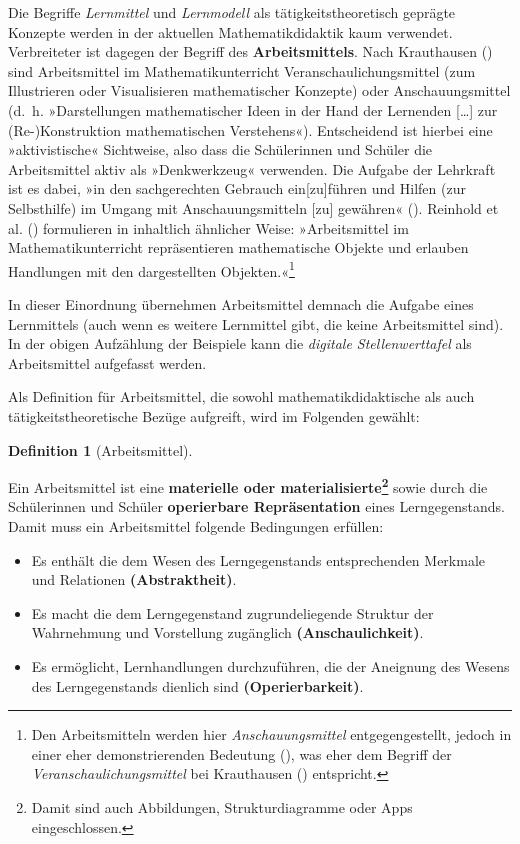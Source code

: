 \documentclass[
]{scrbook}
\providecommand{\tightlist}{%
  \setlength{\itemsep}{0pt}\setlength{\parskip}{0pt}}
\theoremstyle{definition}
\newtheorem{definition}{Definition}[chapter]
\theoremstyle{definition}
\theoremstyle{definition}
\theoremstyle{definition}
\theoremstyle{remark}
\begin{document}
Die Begriffe \emph{Lernmittel} und \emph{Lernmodell} als tätigkeitstheoretisch geprägte Konzepte werden in der aktuellen Mathematikdidaktik kaum verwendet. Verbreiteter ist dagegen der Begriff des \textbf{Arbeitsmittels}. Nach Krauthausen () sind Arbeitsmittel im Mathematikunterricht Veranschaulichungsmittel (zum Illustrieren oder Visualisieren mathematischer Konzepte) oder Anschauungsmittel (d.~h. »Darstellungen mathematischer Ideen in der Hand der Lernenden {[}\ldots{]} zur (Re-)Konstruktion mathematischen Verstehens«). Entscheidend ist hierbei eine »aktivistische« Sichtweise, also dass die Schülerinnen und Schüler die Arbeitsmittel aktiv als »Denkwerkzeug« verwenden. Die Aufgabe der Lehrkraft ist es dabei, »in den sachgerechten Gebrauch ein{[}zu{]}führen und Hilfen (zur Selbsthilfe) im Umgang mit Anschauungsmitteln {[}zu{]} gewähren« (). Reinhold et al. () formulieren in inhaltlich ähnlicher Weise: »Arbeitsmittel im Mathematikunterricht repräsentieren mathematische Objekte und erlauben Handlungen mit den dargestellten Objekten.«\footnote{Den Arbeitsmitteln werden hier \emph{Anschauungsmittel} entgegengestellt, jedoch in einer eher demonstrierenden Bedeutung (), was eher dem Begriff der \emph{Veranschaulichungsmittel} bei Krauthausen () entspricht.}

In dieser Einordnung übernehmen Arbeitsmittel demnach die Aufgabe eines Lernmittels (auch wenn es weitere Lernmittel gibt, die keine Arbeitsmittel sind). In der obigen Aufzählung der Beispiele kann die \emph{digitale Stellenwerttafel} als Arbeitsmittel aufgefasst werden.

Als Definition für Arbeitsmittel, die sowohl mathematikdidaktische als auch tätigkeitstheoretische Bezüge aufgreift, wird im Folgenden gewählt:

\begin{definition}[Arbeitsmittel]
\protect\hypertarget{def:Arbeitsmittel}{}\label{def:Arbeitsmittel}

Ein Arbeitsmittel ist eine \textbf{materielle oder materialisierte\footnote{Damit sind auch Abbildungen, Strukturdiagramme oder Apps eingeschlossen.}} sowie durch die Schülerinnen und Schüler \textbf{operierbare Repräsentation} eines Lerngegenstands. Damit muss ein Arbeitsmittel folgende Bedingungen erfüllen:

\begin{itemize}
\tightlist
\item
  Es enthält die dem Wesen des Lerngegenstands entsprechenden Merkmale und Relationen \textbf{(Abstraktheit)}.
\item
  Es macht die dem Lerngegenstand zugrundeliegende Struktur der Wahrnehmung und Vorstellung zugänglich \textbf{(Anschaulichkeit)}.
\item
  Es ermöglicht, Lernhandlungen durchzuführen, die der Aneignung des Wesens des Lerngegenstands dienlich sind \textbf{(Operierbarkeit)}.
\end{itemize}

\end{definition}
\end{document}

